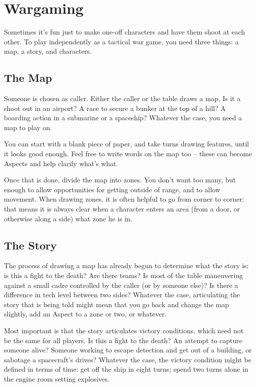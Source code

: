 \section[Wargaming]{Wargaming}
\label{sec:personal-combat-wargaming}

Sometimes it's fun just to make one-off characters and have them shoot at each other. To play independently as a tactical war game, you need three things: a map, a story, and characters.

\subsection{The Map}
\label{sec:personal-combat-wargaming-map}

Someone is chosen as caller. Either the caller or the table draws a map. Is it a shoot out in an airport? A race to secure a bunker at the top of a hill? A boarding action in a submarine or a spaceship? Whatever the case, you need a map to play on.

You can start with a blank piece of paper, and take turns drawing features, until it looks good enough. Feel free to write words on the map too – these can become Aspects and help clarify what's what.

Once that is done, divide the map into zones. You don't want too many, but enough to allow opportunities for getting outside of range, and to allow movement. When drawing zones, it is often helpful to go from corner to corner: that means it is always clear when a character enters an area (from a door, or otherwise along a side) what zone he is in.

\subsection{The Story}
\label{sec:personal-combat-wargaming-story}

The process of drawing a map has already begun to determine what the story is: is this a fight to the death? Are there teams? Is most of the table maneuvering against a small cadre controlled by the caller (or by someone else)? Is there a difference in tech level between two sides? Whatever the case, articulating the story that is being told might mean that you go back and change the map slightly, add an Aspect to a zone or two, or whatever.

Most important is that the story articulates victory conditions, which need not be the same for all players. Is this a fight to the death? An attempt to capture someone alive? Someone working to escape detection and get out of a building, or sabotage a spacecraft's drives? Whatever the case, the victory condition might be defined in terms of time: get off the ship in eight turns; spend two turns alone in the engine room setting explosives.

